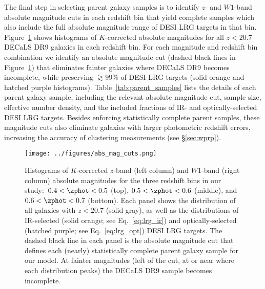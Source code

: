 \documentclass[twocolumn,apj,iop,tighten]{emulateapj2}
\begin{document}
The final step in selecting parent galaxy samples is to identify $z$- and $W1$-band absolute magnitude cuts in each redshift bin that yield complete samples which also include the full absolute magnitude range of DESI LRG targets in that bin. Figure~\ref{fig:abs_mag_cuts} shows histograms of $K$-corrected absolute magnitudes for all $z<20.7$ DECaLS DR9 galaxies in each redshift bin. For each magnitude and redshift bin combination we identify an absolute magnitude cut (dashed black lines in Figure~\ref{fig:abs_mag_cuts}) that eliminates fainter galaxies where DECaLS DR9 becomes incomplete, while preserving $\gtrsim99\%$ of DESI LRG targets (solid orange and hatched purple histograms).
Table~\ref{tab:parent_samples} lists the details of each parent galaxy sample, including the relevant absolute magnitude cut, sample size, effective number density, and the included fractions of IR- and optically-selected DESI LRG targets. Besides enforcing statistically complete parent samples, these magnitude cuts also eliminate galaxies with larger photometric redshift errors, increasing the accuracy of clustering measurements (see \S\ref{sec:wprp}).

\begin{figure}
\centering
\texttt{[image: ../figures/abs\_mag\_cuts.png]}
\caption{Histograms of $K$-corrected $z$-band (left column) and $W1$-band (right column) absolute magnitudes for the three redshift bins in our study:\ ${0.4 < \zphot < 0.5}$ (top), ${0.5 < \zphot < 0.6}$ (middle), and ${0.6 < \zphot < 0.7}$ (bottom). Each panel shows the distribution of all galaxies with $z<20.7$ (solid gray), as well as the distributions of IR-selected (solid orange; see Eq.~\ref{eq:lrg_ir}) and optically-selected (hatched purple; see Eq.~\ref{eq:lrg_opt}) DESI LRG targets. The dashed black line in each panel is the absolute magnitude cut that defines each (nearly) statistically complete parent galaxy sample for our model. At fainter magnitudes (left of the cut, at or near where each distribution peaks) the DECaLS DR9 sample becomes incomplete.
}
\label{fig:abs_mag_cuts}
\end{figure}
\end{document}
